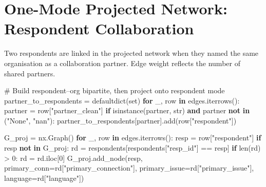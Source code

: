 \documentclass[
  letterpaper,
  DIV=11,
  numbers=noendperiod]{scrartcl}
\newenvironment{Shaded}{\begin{snugshade}}{\end{snugshade}}
\newcommand{\BuiltInTok}[1]{\textcolor[rgb]{0.00,0.23,0.31}{#1}}
\newcommand{\CommentTok}[1]{\textcolor[rgb]{0.37,0.37,0.37}{#1}}
\newcommand{\ControlFlowTok}[1]{\textcolor[rgb]{0.00,0.23,0.31}{\textbf{#1}}}
\newcommand{\DecValTok}[1]{\textcolor[rgb]{0.68,0.00,0.00}{#1}}
\newcommand{\KeywordTok}[1]{\textcolor[rgb]{0.00,0.23,0.31}{\textbf{#1}}}
\newcommand{\NormalTok}[1]{\textcolor[rgb]{0.00,0.23,0.31}{#1}}
\newcommand{\OperatorTok}[1]{\textcolor[rgb]{0.37,0.37,0.37}{#1}}
\newcommand{\StringTok}[1]{\textcolor[rgb]{0.13,0.47,0.30}{#1}}
\begin{document}
\section{One-Mode Projected Network: Respondent
Collaboration}\label{one-mode-projected-network-respondent-collaboration}

Two respondents are linked in the projected network when they named the
same organisation as a collaboration partner. Edge weight reflects the
number of shared partners.

\label{projected-build}
\begin{Shaded}
\begin{Highlighting}[]
\CommentTok{\# Build respondent–org bipartite, then project onto respondent mode}
\NormalTok{partner\_to\_respondents }\OperatorTok{=}\NormalTok{ defaultdict(}\BuiltInTok{set}\NormalTok{)}
\ControlFlowTok{for}\NormalTok{ \_, row }\KeywordTok{in}\NormalTok{ edges.iterrows():}
\NormalTok{    partner }\OperatorTok{=}\NormalTok{ row[}\StringTok{"partner\_clean"}\NormalTok{]}
    \ControlFlowTok{if} \BuiltInTok{isinstance}\NormalTok{(partner, }\BuiltInTok{str}\NormalTok{) }\KeywordTok{and}\NormalTok{ partner }\KeywordTok{not} \KeywordTok{in}\NormalTok{ (}\StringTok{"None"}\NormalTok{, }\StringTok{"nan"}\NormalTok{):}
\NormalTok{        partner\_to\_respondents[partner].add(row[}\StringTok{"respondent"}\NormalTok{])}

\NormalTok{G\_proj }\OperatorTok{=}\NormalTok{ nx.Graph()}
\ControlFlowTok{for}\NormalTok{ \_, row }\KeywordTok{in}\NormalTok{ edges.iterrows():}
\NormalTok{    resp }\OperatorTok{=}\NormalTok{ row[}\StringTok{"respondent"}\NormalTok{]}
    \ControlFlowTok{if}\NormalTok{ resp }\KeywordTok{not} \KeywordTok{in}\NormalTok{ G\_proj:}
\NormalTok{        rd }\OperatorTok{=}\NormalTok{ respondents[respondents[}\StringTok{"resp\_id"}\NormalTok{] }\OperatorTok{==}\NormalTok{ resp]}
        \ControlFlowTok{if} \BuiltInTok{len}\NormalTok{(rd) }\OperatorTok{\textgreater{}} \DecValTok{0}\NormalTok{:}
\NormalTok{            rd }\OperatorTok{=}\NormalTok{ rd.iloc[}\DecValTok{0}\NormalTok{]}
\NormalTok{            G\_proj.add\_node(resp,}
\NormalTok{                            primary\_conn}\OperatorTok{=}\NormalTok{rd[}\StringTok{"primary\_connection"}\NormalTok{],}
\NormalTok{                            primary\_issue}\OperatorTok{=}\NormalTok{rd[}\StringTok{"primary\_issue"}\NormalTok{],}
\NormalTok{                            language}\OperatorTok{=}\NormalTok{rd[}\StringTok{"language"}\NormalTok{])}


\end{Highlighting}
\end{Shaded}
\end{document}
